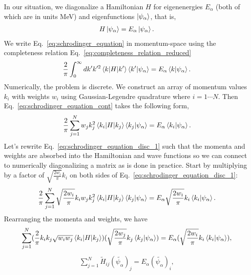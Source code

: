 \documentclass[preprintnumbers,floatfix,aps,prc,preprint,nofootinbib]{revtex4-1}
\begin{document}
In our situation, we diagonalize a Hamiltonian $H$ for eigenenergies $E_{\alpha}$ (both of which are in units MeV) and eigenfunctions $\ket{\psi_{\alpha}}$, that is,
%
\begin{eqnarray}
    \label{eq:schrodinger_equation}
    H \ket{\psi_{\alpha}} = E_{\alpha} \ket{\psi_{\alpha}}.
\end{eqnarray}
%
We write Eq.~\eqref{eq:schrodinger_equation} in momentum-space using the completeness relation Eq.~\eqref{eq:completeness_relation_reduced}
%
\begin{eqnarray}
    \label{eq:schrodinger_equation_cont}
    \frac{2}{\pi} \int_0^{\infty} dk' k'^2 \mel{k}{H}{k'} \bra{k'} \ket{\psi_{\alpha}} = E_{\alpha} \bra{k} \ket{\psi_{\alpha}}.
\end{eqnarray}
%
Numerically, the problem is discrete.
We construct an array of momentum values $k_i$ with weights $w_i$ using Gaussian-Legendre quadrature where $i=1 \cdots N$.
Then Eq.~\eqref{eq:schrodinger_equation_cont} takes the following form,
%
\begin{eqnarray}
    \label{eq:schrodinger_equation_disc_1}
    \frac{2}{\pi} \sum_{j=1}^{N} w_j k_j^2 \mel{k_i}{H}{k_j} \bra{k_j} \ket{\psi_{\alpha}} = E_{\alpha} \bra{k_i} \ket{\psi_{\alpha}}.
\end{eqnarray}
%
Let's rewrite Eq.~\eqref{eq:schrodinger_equation_disc_1} such that the momenta and weights are absorbed into the Hamiltonian and wave functions so we can connect to numerically diagonalizing a matrix as is done in practice.
Start by multiplying by a factor of $\sqrt{\frac{2 w_i}{\pi}} k_i$ on both sides of Eq.~\eqref{eq:schrodinger_equation_disc_1}:
%
\begin{eqnarray}
    \label{eq:schrodinger_equation_disc_2}
    \frac{2}{\pi} \sum_{j=1}^{N} \sqrt{\frac{2 w_i}{\pi}} k_i w_j k_j^2 \mel{k_i}{H}{k_j} \bra{k_j} \ket{\psi_{\alpha}} = E_{\alpha} \sqrt{\frac{2 w_i}{\pi}} k_i \bra{k_i} \ket{\psi_{\alpha}}.
\end{eqnarray}
%
Rearranging the momenta and weights, we have
%
\begin{eqnarray}
    \label{eq:schrodinger_equation_disc_3}
    \sum_{j=1}^{N} ( \frac{2}{\pi} k_i k_j \sqrt{w_i w_j} \mel{k_i}{H}{k_j} ) ( \sqrt{\frac{2 w_j}{\pi}} k_j \bra{k_j} \ket{\psi_{\alpha}} ) = E_{\alpha} ( \sqrt{\frac{2 w_i}{\pi}} k_i \bra{k_i} \ket{\psi_{\alpha}} ),
\end{eqnarray}
%
\begin{eqnarray}
    \label{eq:schrodinger_equation_disc_4}
    \sum_{j=1}^{N} \tilde{H}_{ij} (\tilde{\psi_{\alpha}})_j = E_{\alpha} (\tilde{\psi_{\alpha}})_i,
\end{eqnarray}
\end{document}
